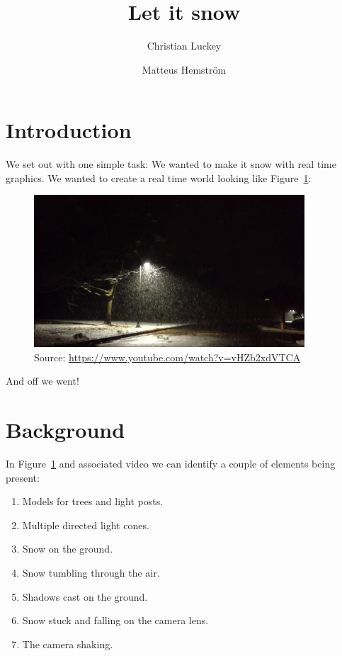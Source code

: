 \documentclass[a4paper,12pt]{article}
\title{Let it snow}
\author{Christian Luckey}
\author{Matteus Hemström}
\begin{document}
\maketitle

\newpage

\section{Introduction}

We set out with one simple task: We wanted to make it snow with real time graphics. We wanted to create a real time world looking like Figure~\ref{fig:youtube}:

\begin{figure}[ht]
  \centering
  \includegraphics[width=0.9\textwidth]{youtube}
  \caption{\label{fig:youtube} Source: \href{https://www.youtube.com/watch?v=vHZb2xdVTCA}{https://www.youtube.com/watch?v=vHZb2xdVTCA}}
\end{figure}
\noindent
And off we went!



\section{Background}

In Figure~\ref{fig:youtube} and associated video we can identify a couple of elements being present:

\begin{enumerate}
  \item Models for trees and light posts.
  \item Multiple directed light cones.
  \item Snow on the ground.
  \item Snow tumbling through the air.
  \item Shadows cast on the ground.
  \item Snow stuck and falling on the camera lens.
  \item The camera shaking.
\end{enumerate}
\end{document}
